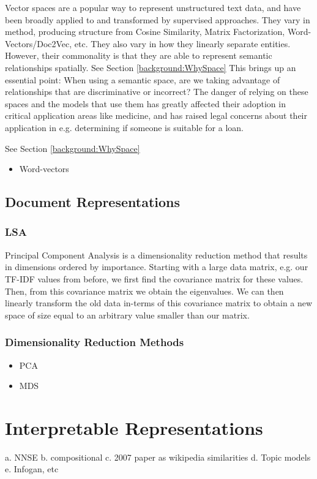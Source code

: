 Vector spaces are a popular way to represent unstructured text data, and have been broadly applied to and transformed by supervised approaches. They vary in method, producing structure from Cosine Similarity, Matrix Factorization, Word-Vectors/Doc2Vec, etc. %
They also vary in how they linearly separate entities. %
However, their commonality is that they are able to represent semantic relationships spatially. %
See Section \ref{background:WhySpace}
This brings up an essential point: When using a semantic space, are we taking advantage of relationships that are discriminative or incorrect? The danger of relying on these spaces and the models that use them has greatly affected their adoption in critical application areas like medicine, %
and has raised legal concerns about their application in e.g. determining if someone is suitable for a loan. 

See Section \ref{background:WhySpace}\begin{itemize}
	\item Word-vectors
\end{itemize}
\subsection{Document Representations}
\subsubsection{LSA}
Principal Component Analysis is a dimensionality reduction method that results in dimensions ordered by importance. Starting with a large data matrix, e.g. our TF-IDF values from before, we first find the covariance matrix for these values. Then, from this covariance matrix we obtain the eigenvalues. We can then linearly transform the old data in-terms of this covariance matrix to obtain a new space of size equal to an arbitrary value smaller than our matrix.

\subsubsection{Dimensionality Reduction Methods}\label{ch2:reps}
\begin{itemize} 
	\item PCA %
	\item MDS
\end{itemize}
\section{Interpretable Representations}\label{ch2:Interpretability}
a. NNSE
b. compositional
c. 2007 paper as wikipedia similarities
d. Topic models\label{bg:TopicModel}
e. Infogan, etc

